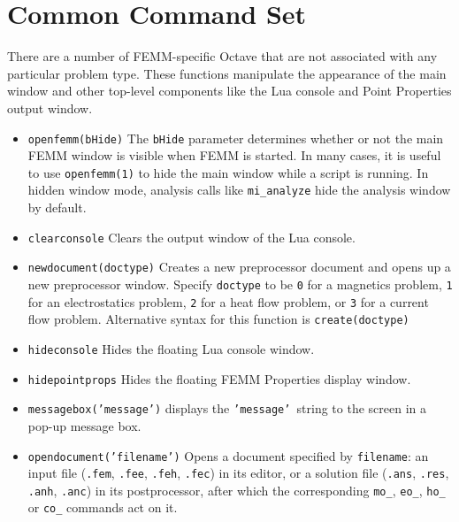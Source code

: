 
\section{Common Command Set}

There are a number of FEMM-specific Octave that are not associated with any particular problem type.
These functions manipulate the appearance of the main window and
other top-level components like the Lua console and Point
Properties output window.

\begin{itemize}

\item {\tt openfemm(bHide)} The {\tt bHide} parameter determines whether or not the main FEMM window is visible when FEMM is started. In many cases, it is useful to use {\tt openfemm(1)} to hide the main window while a script is running.  In hidden window mode, analysis calls like \verb+mi_analyze+ hide the analysis window by default.

\item {\tt clearconsole} Clears the output window of the Lua console.

\item {\tt newdocument(doctype)} Creates a new preprocessor document
and opens up a new preprocessor window.  Specify {\tt doctype} to
be {\tt 0} for a magnetics problem, {\tt 1} for an electrostatics
problem, {\tt 2} for a heat flow problem, or {\tt 3} for a current
flow problem. Alternative syntax for this function is {\tt create(doctype)}

\item{\tt hideconsole} Hides the floating Lua console window.

\item{\tt hidepointprops} Hides the floating FEMM Properties display window.

\item \texttt{messagebox('message')} displays the \texttt{'message' }string to the
screen in a pop-up message box.

\item {\tt opendocument('filename')} Opens a document specified by {\tt filename}:
an input file ({\tt .fem}, {\tt .fee}, {\tt .feh}, {\tt .fec}) in its editor,
or a solution file ({\tt .ans}, {\tt .res}, {\tt .anh}, {\tt .anc}) in its
postprocessor, after which the corresponding {\tt mo\_}, {\tt eo\_}, {\tt ho\_}
or {\tt co\_} commands act on it.


\end{itemize}
